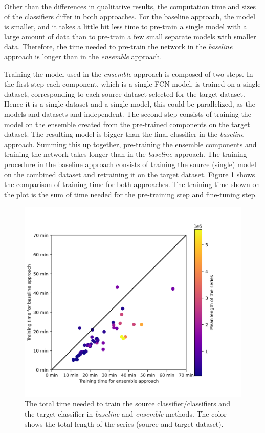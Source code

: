\documentclass[a4paper,11pt,twoside]{report}
\theoremstyle{definition}
\begin{document}
Other than the differences in qualitative results, the computation time and sizes of the classifiers differ in both approaches.
For the baseline approach, the model is smaller, and it takes a little bit less time to pre-train a single model with a large amount of data than to pre-train a few small separate models with smaller data. Therefore, the time needed to pre-train  the network in the \textit{baseline} approach is longer than in the \textit{ensemble} approach.

Training the model used in the \textit{ensemble} approach is composed of two steps. In the first step each component, which is a single FCN model, is trained on a single dataset, corresponding to each source dataset selected for the target dataset. Hence it is a single dataset and a single model, this could be parallelized, as the models and datasets and independent. The second step consists of training the model on the ensemble created from the pre-trained components on the target dataset. The resulting model is bigger than the final classifier in the \textit{baseline} approach. Summing this up together, pre-training the ensemble components and training the network takes longer than in the \textit{baseline} approach. The training procedure in the baseline approach consists of training the source (single) model on the combined dataset and retraining it on the target dataset.
Figure \ref{fig:baseline_ensemble_traning_time} shows the comparison of training time for both approaches.  The training time shown on the plot is the sum of time needed for the pre-training step and fine-tuning step.
\FloatBarrier
\begin{figure}[h!t]
\centering
\includegraphics[width=17cm]{imgs/baseline_vs_ensemble/times_comparison.png}
\caption{The total time needed to train the source classifier/classifiers and the target classifier in \textit{baseline} and \textit{ensemble} methods. The color shows the total length of the series (source and target dataset).}
\label{fig:baseline_ensemble_traning_time}
\end{figure}
\end{document}
